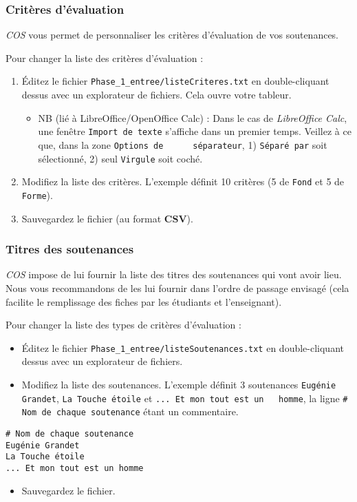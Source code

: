 \documentclass[11pt]{article}
\begin{document}
\subsubsection{Critères d'évaluation}
\label{sec-4-1-3}
\emph{COS} vous permet de personnaliser les critères d'évaluation de vos
soutenances.

Pour changer la liste des critères d'évaluation :
\begin{enumerate}
\item Éditez le fichier \verb~Phase_1_entree/listeCriteres.txt~ en
double-cliquant dessus avec un explorateur de fichiers. Cela ouvre
votre tableur.
\begin{itemize}
\item NB (lié à LibreOffice/OpenOffice Calc) : Dans le cas de
\emph{LibreOffice Calc}, une fenêtre \verb~Import de texte~ s'affiche dans
un premier temps. Veillez à ce que, dans la zone \verb~Options de      séparateur~, 1) \verb~Séparé par~ soit sélectionné, 2) seul \verb~Virgule~
soit coché.
\end{itemize}
\item Modifiez la liste des critères. L'exemple définit 10 critères (5 de
\verb~Fond~ et 5 de \verb~Forme~).
\item Sauvegardez le fichier (au format \textbf{CSV}).
\end{enumerate}
\subsubsection{Titres des soutenances}
\label{sec-4-1-4}
\emph{COS} impose de lui fournir la liste des titres des soutenances qui
vont avoir lieu. Nous vous recommandons de les lui fournir dans
l'ordre de passage envisagé (cela facilite le remplissage des fiches
par les étudiants et l'enseignant).

Pour changer la liste des types de critères d'évaluation :
\begin{itemize}
\item Éditez le fichier \verb~Phase_1_entree/listeSoutenances.txt~ en
double-cliquant dessus avec un explorateur de fichiers.
\item Modifiez la liste des soutenances. L'exemple définit 3 soutenances
\verb~Eugénie Grandet~, \verb~La Touche étoile~ et \verb~... Et mon tout est un   homme~, la ligne \verb~# Nom de chaque soutenance~ étant un commentaire.
\end{itemize}
\begin{verbatim}
# Nom de chaque soutenance
Eugénie Grandet
La Touche étoile
... Et mon tout est un homme
\end{verbatim}
\begin{itemize}
\item Sauvegardez le fichier.
\end{itemize}
\end{document}
